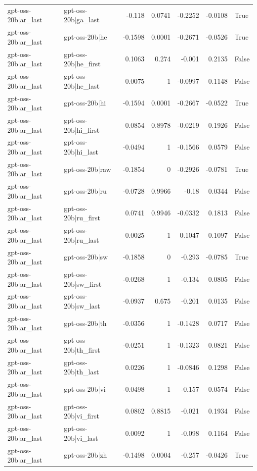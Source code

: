 \begin{table}
\begin{tabular}{l l r r r r l}
gpt-oss-20b|ar_last & gpt-oss-20b|ga_last & -0.118 & 0.0741 & -0.2252 & -0.0108 & True \\
gpt-oss-20b|ar_last & gpt-oss-20b|he & -0.1598 & 0.0001 & -0.2671 & -0.0526 & True \\
gpt-oss-20b|ar_last & gpt-oss-20b|he_first & 0.1063 & 0.274 & -0.001 & 0.2135 & False \\
gpt-oss-20b|ar_last & gpt-oss-20b|he_last & 0.0075 & 1 & -0.0997 & 0.1148 & False \\
gpt-oss-20b|ar_last & gpt-oss-20b|hi & -0.1594 & 0.0001 & -0.2667 & -0.0522 & True \\
gpt-oss-20b|ar_last & gpt-oss-20b|hi_first & 0.0854 & 0.8978 & -0.0219 & 0.1926 & False \\
gpt-oss-20b|ar_last & gpt-oss-20b|hi_last & -0.0494 & 1 & -0.1566 & 0.0579 & False \\
gpt-oss-20b|ar_last & gpt-oss-20b|raw & -0.1854 & 0 & -0.2926 & -0.0781 & True \\
gpt-oss-20b|ar_last & gpt-oss-20b|ru & -0.0728 & 0.9966 & -0.18 & 0.0344 & False \\
gpt-oss-20b|ar_last & gpt-oss-20b|ru_first & 0.0741 & 0.9946 & -0.0332 & 0.1813 & False \\
gpt-oss-20b|ar_last & gpt-oss-20b|ru_last & 0.0025 & 1 & -0.1047 & 0.1097 & False \\
gpt-oss-20b|ar_last & gpt-oss-20b|sw & -0.1858 & 0 & -0.293 & -0.0785 & True \\
gpt-oss-20b|ar_last & gpt-oss-20b|sw_first & -0.0268 & 1 & -0.134 & 0.0805 & False \\
gpt-oss-20b|ar_last & gpt-oss-20b|sw_last & -0.0937 & 0.675 & -0.201 & 0.0135 & False \\
gpt-oss-20b|ar_last & gpt-oss-20b|th & -0.0356 & 1 & -0.1428 & 0.0717 & False \\
gpt-oss-20b|ar_last & gpt-oss-20b|th_first & -0.0251 & 1 & -0.1323 & 0.0821 & False \\
gpt-oss-20b|ar_last & gpt-oss-20b|th_last & 0.0226 & 1 & -0.0846 & 0.1298 & False \\
gpt-oss-20b|ar_last & gpt-oss-20b|vi & -0.0498 & 1 & -0.157 & 0.0574 & False \\
gpt-oss-20b|ar_last & gpt-oss-20b|vi_first & 0.0862 & 0.8815 & -0.021 & 0.1934 & False \\
gpt-oss-20b|ar_last & gpt-oss-20b|vi_last & 0.0092 & 1 & -0.098 & 0.1164 & False \\
gpt-oss-20b|ar_last & gpt-oss-20b|zh & -0.1498 & 0.0004 & -0.257 & -0.0426 & True \\

\end{tabular}
\end{table}
